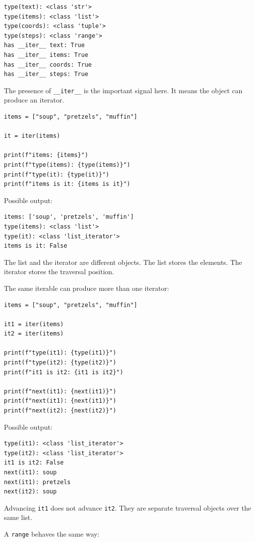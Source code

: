 \begin{verbatim}
type(text): <class 'str'>
type(items): <class 'list'>
type(coords): <class 'tuple'>
type(steps): <class 'range'>
has __iter__ text: True
has __iter__ items: True
has __iter__ coords: True
has __iter__ steps: True
\end{verbatim}

The presence of \texttt{\_\_iter\_\_} is the important signal here. It means the object can produce an iterator.

\begin{verbatim}
items = ["soup", "pretzels", "muffin"]

it = iter(items)

print(f"items: {items}")
print(f"type(items): {type(items)}")
print(f"type(it): {type(it)}")
print(f"items is it: {items is it}")
\end{verbatim}

Possible output:

\begin{verbatim}
items: ['soup', 'pretzels', 'muffin']
type(items): <class 'list'>
type(it): <class 'list_iterator'>
items is it: False
\end{verbatim}

The list and the iterator are different objects. The list stores the elements. The iterator stores the traversal position.

The same iterable can produce more than one iterator:

\begin{verbatim}
items = ["soup", "pretzels", "muffin"]

it1 = iter(items)
it2 = iter(items)

print(f"type(it1): {type(it1)}")
print(f"type(it2): {type(it2)}")
print(f"it1 is it2: {it1 is it2}")

print(f"next(it1): {next(it1)}")
print(f"next(it1): {next(it1)}")
print(f"next(it2): {next(it2)}")
\end{verbatim}

Possible output:

\begin{verbatim}
type(it1): <class 'list_iterator'>
type(it2): <class 'list_iterator'>
it1 is it2: False
next(it1): soup
next(it1): pretzels
next(it2): soup
\end{verbatim}

Advancing \texttt{it1} does not advance \texttt{it2}. They are separate traversal objects over the same list.

A \texttt{range} behaves the same way:

